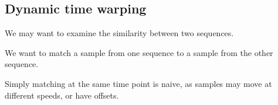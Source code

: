 
\subsection{Dynamic time warping}

We may want to examine the similarity between two sequences.

We want to match a sample from one sequence to a sample from the other sequence.

Simply matching at the same time point is naive, as samples may move at different speeds, or have offsets.

